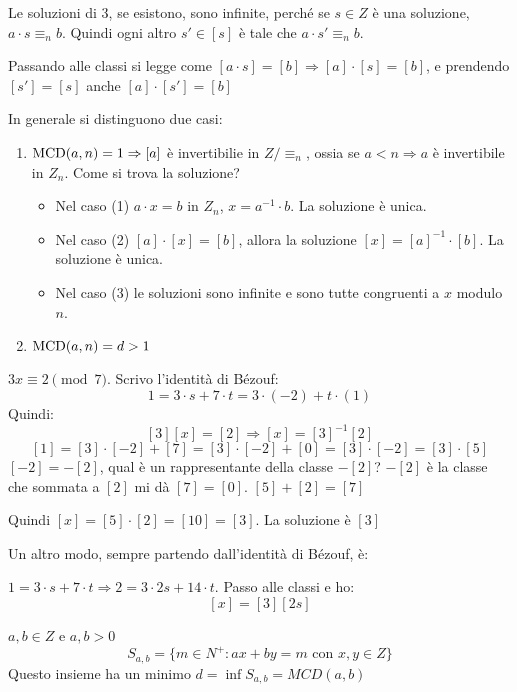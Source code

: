 \begin{oss}
Le soluzioni di 3, se esistono, sono infinite, perch\'e se $s \in Z$ \`e una soluzione, $a \cdot s \equiv_n b$. Quindi ogni altro $s' \in [s]$ \`e tale che $a \cdot s' \equiv_n b$.

Passando alle classi si legge come $[a \cdot s] = [b] \Rightarrow [a] \cdot [s] = [b]$, e prendendo $[s'] = [s]$ anche $[a] \cdot [s'] = [b]$
\end{oss}

In generale si distinguono due casi:
\begin{enumerate}
    \item $\operatorname{MCD}(a, n) = 1 \Rightarrow [a]$ \`e invertibilie in $Z / \equiv_n$, ossia se $a < n \Rightarrow a$ \`e invertibile in $Z_n$. Come si trova la soluzione?
    \begin{itemize}
        \item Nel caso (1) $a \cdot x = b$ in $Z_n$, $x = a^{-1} \cdot b$. La soluzione \`e unica.
        \item Nel caso (2) $[a] \cdot [x] = [b]$, allora la soluzione $[x] = [a]^{-1} \cdot [b]$. La soluzione \`e unica.
        \item Nel caso (3) le soluzioni sono infinite e sono tutte congruenti a $x$ modulo $n$.
    \end{itemize}
    \item $\operatorname{MCD}(a, n) = d > 1$
\end{enumerate}

\begin{exmp}
$3 x \equiv 2 \pmod{7}$. Scrivo l'identit\`a di B\'ezouf:
\[
1 = 3 \cdot s + 7 \cdot t = 3 \cdot (-2) + t \cdot (1)
\]
Quindi:
\[
[3] [x] = [2] \Rightarrow [x] = [3]^{-1} [2]
\]
\[
[1] = [3] \cdot [-2] + [7] = [3] \cdot [-2] + [0] = [3] \cdot [-2] = [3] \cdot [5]
\]
$[-2] = -[2]$, qual \`e un rappresentante della classe $-[2]$? $-[2]$ \`e la classe che sommata a $[2]$ mi d\`a $[7] = [0]$. $[5] + [2] = [7]$

Quindi $[x] = [5] \cdot [2] = [10] = [3]$. La soluzione \`e $[3]$

Un altro modo, sempre partendo dall'identit\`a di B\'ezouf, \`e:

$1 = 3 \cdot s + 7 \cdot t \Rightarrow 2 = 3 \cdot 2s + 14 \cdot t$. Passo alle classi e ho:
\[
[x] = [3] [2s]
\]
\end{exmp}

$a, b \in Z$ e $a,b > 0$
\[
S_{a,b} =  \{m \in N^+ : ax + by = m \text{ con } x,y \in Z \}
\]
Questo insieme ha un minimo $d = \inf S_{a,b} = MCD(a,b)$

